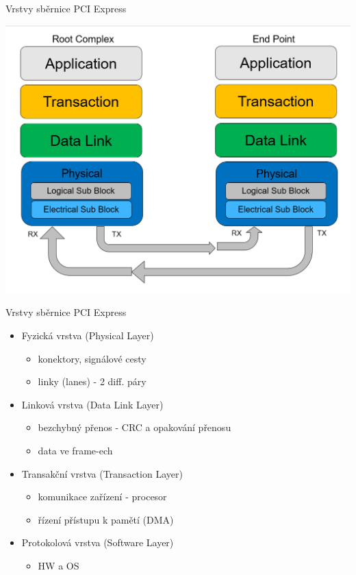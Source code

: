\documentclass[aspectratio=43]{beamer}
\begin{document}
\begin{frame}{Vrstvy sběrnice PCI Express}
	 
	\begin{center}
		\includegraphics[width=0.85\linewidth]{extrahovane_obrazky/pcie_l.png}
	\end{center}
\end{frame}

\begin{frame}{Vrstvy sběrnice PCI Express}
	 
	\begin{itemize}
		\item Fyzická vrstva (Physical Layer)
		      \begin{itemize}
		      	\item konektory, signálové cesty
		      	\item linky (lanes) - 2 diff. páry
		      \end{itemize}
		\item Linková vrstva (Data Link Layer)
		      \begin{itemize}
		      	\item bezchybný přenos - CRC a opakování přenosu
		      	\item data ve frame-ech
		      \end{itemize}
		\item Transakční vrstva (Transaction Layer)
		      \begin{itemize}
		      	\item komunikace zařízení - procesor
		      	\item řízení přístupu k pamětí (DMA)
		      \end{itemize}
		\item Protokolová vrstva (Software Layer)
		      \begin{itemize}
		      	\item HW a OS
		      \end{itemize}
	\end{itemize}
\end{frame}
\end{document}
